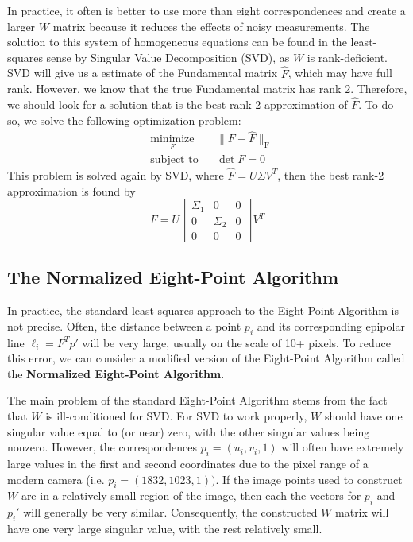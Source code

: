 \documentclass[a4paper, 12pt]{article}
\renewcommand\emph{\textbf}
\begin{document}
In practice, it often is better to use more than eight correspondences and create a larger $W$ matrix because it reduces the effects of noisy measurements. The solution to this system of homogeneous equations can be found in the least-squares sense by Singular Value Decomposition (SVD), as $W$ is rank-deficient. SVD will give us a estimate of the Fundamental matrix $\hat{F}$, which may have full rank. However, we know that the true Fundamental matrix has rank 2. Therefore, we should look for a solution that is the best rank-2 approximation of $\hat{F}$. To do so, we solve the following optimization problem:
\begin{equation}
\begin{aligned}
& \underset{F}{\text{minimize}}
& & \|F-\hat{F}\|_\mathrm{F}  \\
& \text{subject to}
& & \det F = 0
\end{aligned}
\end{equation}
This problem is solved again by SVD, where $\hat{F} = U\Sigma V^T$, then the best rank-2 approximation is found by
\begin{equation}
F = U\begin{bmatrix}\Sigma_1&0&0\\0&\Sigma_2&0\\0&0&0\end{bmatrix}V^T
\end{equation}

\subsection{The Normalized Eight-Point Algorithm}
In practice, the standard least-squares approach to the Eight-Point Algorithm is not precise. Often, the distance between a point $p_i$ and its corresponding epipolar line $\ell_i = F^Tp'$ will be very large, usually on the scale of 10+ pixels. To reduce this error, we can consider a modified version of the Eight-Point Algorithm called the \emph{Normalized Eight-Point Algorithm}. 

The main problem of the standard Eight-Point Algorithm stems from the fact that $W$ is ill-conditioned for SVD. For SVD to work properly, $W$ should have one singular value equal to (or near) zero, with the other singular values being nonzero. However, the correspondences $p_i = (u_i, v_i, 1)$ will often have extremely large values in the first and second coordinates due to the pixel range of a modern camera (i.e. $p_i = (1832, 1023, 1))$. If the image points used to construct $W$ are in a relatively small region of the image, then each the vectors for $p_i$ and $p_i'$ will generally be very similar. Consequently, the constructed $W$ matrix will have one very large singular value, with the rest relatively small. 
\end{document}

